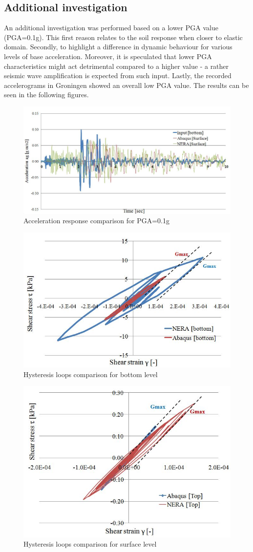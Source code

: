 	\subsection{Additional investigation}
	An additional investigation was performed based on a lower PGA value (PGA=0.1g). This first reason relates to the soil response when closer to elastic domain. Secondly, to highlight a difference in dynamic behaviour for various levels of base acceleration. Moreover, it is speculated that lower PGA characteristics might act detrimental compared to a higher value - a rather seismic wave amplification is expected from such input. Lastly, the recorded accelerograms in Groningen showed an overall low PGA value. The results can be seen in the following figures.
	
	\begin{figure}[!h]
		\centering
		\includegraphics[width=0.7\linewidth]{"acc_low"}
		\caption{Acceleration response comparison for PGA=0.1g}
		\label{acc_low}
	\end{figure}
	
	\begin{figure}[!h]
		\centering
		\includegraphics[width=0.7\linewidth]{"hysteresis_low_bot"}
		\caption{Hysteresis loops comparison for bottom level}
		\label{hyst_bot}
	\end{figure}
	
	\begin{figure}[!h]
		\centering
		\includegraphics[width=0.6\linewidth]{"hysteresis_low_surf"}
		\caption{Hysteresis loops comparison for surface level}
		\label{hyst_top}
	\end{figure}
	

